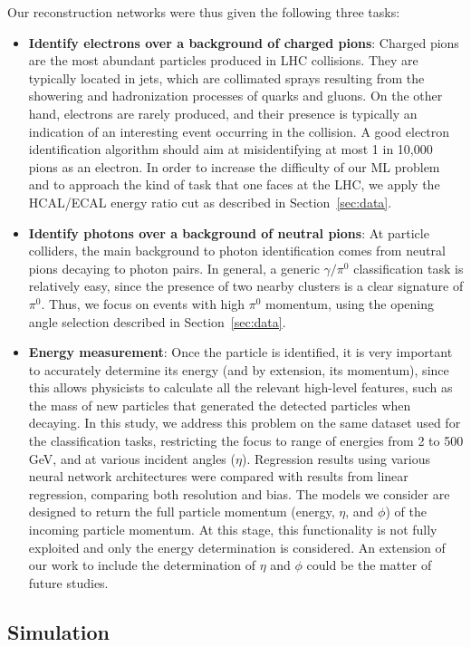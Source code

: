 Our reconstruction networks were thus given the following three tasks:
\begin{itemize}
\item {\bf Identify electrons over a background of charged pions}: Charged pions are the most abundant particles produced in LHC collisions. They are typically located in jets, which are collimated sprays resulting from the showering and hadronization processes of quarks and gluons. On the other hand, electrons are rarely produced, and their presence is typically an indication of an interesting event occurring in the collision. A good electron identification algorithm should aim at misidentifying at most 1 in 10,000 pions as an electron. In order to increase the difficulty of our ML problem and to approach the kind of task that one faces at the LHC, we apply the HCAL/ECAL energy ratio cut as described in Section~\ref{sec:data}.
\item {\bf Identify photons over a background of neutral pions}: At particle colliders, the main background to photon identification comes from neutral pions decaying to photon pairs. In general, a generic $\gamma/\pi^0$ classification task is relatively easy, since the presence of two nearby clusters is a clear signature of $\pi^0$. Thus, we focus on events with high $\pi^0$ momentum, using the opening angle selection described in Section~\ref{sec:data}.
\item {\bf Energy measurement}: Once the particle is identified, it is very important to accurately determine its energy (and by extension, its momentum), since this allows physicists to calculate all the relevant high-level features, such as the mass of new particles that generated the detected particles when decaying. In this study, we address this problem on the same dataset used for the classification tasks, restricting the focus to range of energies from 2 to 500 GeV, and at various incident angles ($\eta$). Regression results using various neural network architectures were compared with results from linear regression, comparing both resolution and bias. The models we consider are designed to return the full particle momentum (energy, $\eta$, and $\phi$) of the incoming particle momentum. At this stage, this functionality is not fully exploited and only the energy determination is considered. An extension of our work to include the determination of $\eta$ and $\phi$ could be the matter of future studies.
\end{itemize}

\subsection*{Simulation}
\label{sec:sim}

